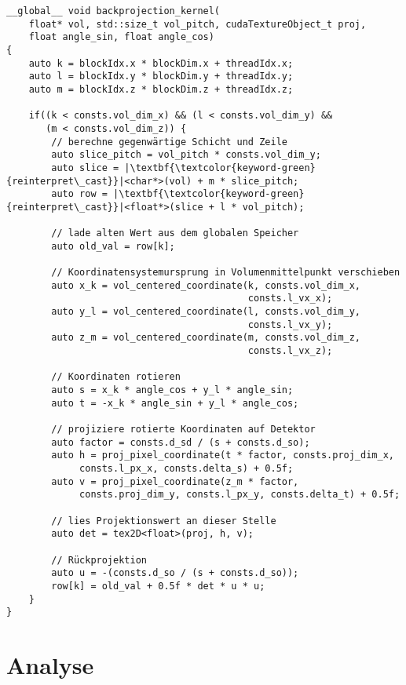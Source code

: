 \begin{code}
\begin{verbatim}
__global__ void backprojection_kernel(
    float* vol, std::size_t vol_pitch, cudaTextureObject_t proj,
    float angle_sin, float angle_cos)
{
    auto k = blockIdx.x * blockDim.x + threadIdx.x;
    auto l = blockIdx.y * blockDim.y + threadIdx.y;
    auto m = blockIdx.z * blockDim.z + threadIdx.z;

    if((k < consts.vol_dim_x) && (l < consts.vol_dim_y) &&
       (m < consts.vol_dim_z)) {
        // berechne gegenwärtige Schicht und Zeile
        auto slice_pitch = vol_pitch * consts.vol_dim_y;
        auto slice = |\textbf{\textcolor{keyword-green}{reinterpret\_cast}}|<char*>(vol) + m * slice_pitch;
        auto row = |\textbf{\textcolor{keyword-green}{reinterpret\_cast}}|<float*>(slice + l * vol_pitch);

        // lade alten Wert aus dem globalen Speicher
        auto old_val = row[k];

        // Koordinatensystemursprung in Volumenmittelpunkt verschieben
        auto x_k = vol_centered_coordinate(k, consts.vol_dim_x,
                                           consts.l_vx_x);
        auto y_l = vol_centered_coordinate(l, consts.vol_dim_y,
                                           consts.l_vx_y);
        auto z_m = vol_centered_coordinate(m, consts.vol_dim_z,
                                           consts.l_vx_z);

        // Koordinaten rotieren
        auto s = x_k * angle_cos + y_l * angle_sin;
        auto t = -x_k * angle_sin + y_l * angle_cos;

        // projiziere rotierte Koordinaten auf Detektor
        auto factor = consts.d_sd / (s + consts.d_so);
        auto h = proj_pixel_coordinate(t * factor, consts.proj_dim_x,
             consts.l_px_x, consts.delta_s) + 0.5f;
        auto v = proj_pixel_coordinate(z_m * factor,
             consts.proj_dim_y, consts.l_px_y, consts.delta_t) + 0.5f;

        // lies Projektionswert an dieser Stelle
        auto det = tex2D<float>(proj, h, v);

        // Rückprojektion
        auto u = -(consts.d_so / (s + consts.d_so));
        row[k] = old_val + 0.5f * det * u * u;
    }
}
\end{verbatim}
\label{app:impl_bp}
\end{code}

\chapter{Analyse}
